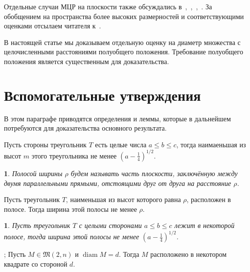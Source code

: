 \documentclass[11pt,twoside,draft
]{article}
\newtheorem{Definition}{\indent {\sc Definition}}
\newtheorem{Corollary}{\indent {\sc Corollary}}
\begin{document}
Отдельные случаи МЦР на плоскости также обсуждались
в~\cite[\S 5.11]{brass2006research},~\cite[\S D20]{guy2013unsolved},~\cite{our-pmm-2018},~\cite{our-ped-2018}.
За обобщением на пространства более высоких размерностей и соответствующими оценками
отсылаем читателя к~\cite{kurz2005characteristic,nozaki2013lower}.

В настоящей статье мы доказываем отдельную оценку на диаметр множества с целочисленными расстояниями полуобщего положения.
Требование полуобщего положения является существенным для доказательства.



\section{Вспомогательные утверждения}

В этом параграфе приводятся определения и леммы, которые в дальнейшем потребуются
для доказательства основного результата.


\begin{lemma}
	\cite[Observation 1]{solymosi2003note}
	Пусть стороны треугольник $T$ есть целые числа $a \leq b \leq c$,
	тогда наимаеньшая из высот $m$ этого треугольника не менее $\left(a - \frac{1}{4}\right)^{1/2}$.
\end{lemma}

\begin{Definition}
	Полосой ширины $\rho$ будем называть часть плоскости,
	заключённую между двумя параллельными прямыми,
	отстоящими друг от друга на расстояние $\rho$.
\end{Definition}

\begin{lemma}
	\cite{smurov1998stripcoverings}
	Пусть треугольник $T$, наименьшая из высот которого равна $\rho$, расположен в полосе.
	Тогда ширина этой полосы не менее $\rho$.
\end{lemma}

\begin{Corollary}
	\label{cor:solymosi_strip}
	Пусть треугольник $T$ с целыми сторонами $a \leq b \leq c$ лежит в некоторой полосе,
	тогда ширина этой полосы не менее $\left(a - \frac{1}{4}\right)^{1/2}$.
\end{Corollary}


\begin{lemma}
	\cite[Lemma 4]{our-vmmsh-2018};
	\cite[Lemma 2.4]{my-pps-linear-bound-2019}
	\label{lem:square_container}
	Пусть $M\in\mathfrak{M}(2,n)$ и $\operatorname{diam} M = d$.
	Тогда $M$ расположено в некотором квадрате со стороной $d$.
\end{lemma}
\end{document}
